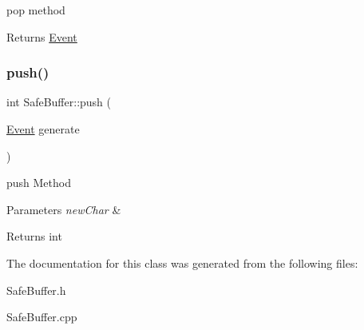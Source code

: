 pop method 

\begin{DoxyReturn}{Returns}
\hyperlink{classEvent}{Event} 
\end{DoxyReturn}
\mbox{\label{classSafeBuffer_ac3ed0799ec2e84c97e36b22c83f7abf5}} 
\subsubsection{\texorpdfstring{push()}{push()}}
{\footnotesize\ttfamily int Safe\+Buffer\+::push (\begin{DoxyParamCaption}\item[{\hyperlink{classEvent}{Event}}]{generate }\end{DoxyParamCaption})}



push Method 


\begin{DoxyParams}{Parameters}
{\em new\+Char} & \\
\hline
\end{DoxyParams}
\begin{DoxyReturn}{Returns}
int 
\end{DoxyReturn}


The documentation for this class was generated from the following files\+:\begin{DoxyCompactItemize}
\item 
Safe\+Buffer.\+h\item 
Safe\+Buffer.\+cpp\end{DoxyCompactItemize}
